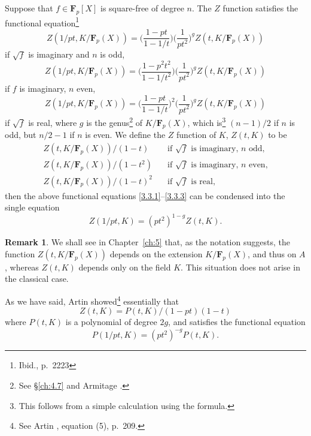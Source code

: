\documentclass[10pt,leqno]{article}
\theoremstyle{definition}
\newtheorem{rema}[theo]{Remark}
\def\FF{\mathbf{F}}
\def\fntwni{Ibid., p.~2223}
\def\fnthze{See \S\ref{ch:4.7} and Armitage \cite{bib:5}.}
\def\fnthon{This follows from a simple calculation using the formula.}
\def\fnthtw{See Artin \cite{bib:6}, equation (5), p.~209.}
\begin{document}
Suppose that $f \in \FF_p[X]$ is square-free of degree $n$.
The $Z$ function satisfies the functional equation\footnote{\fntwni}
\begin{equation}
\label{3.3.1}
Z(1/pt, K/\FF_p(X))
= \biggl(
\frac{1-pt}{1-1/t}
\biggr)
\biggl(
\frac{1}{pt^2}
\biggr)^g
Z(t, K/\FF_p(X))
\end{equation}
if $\sqrt f$ is imaginary and $n$ is odd,
\begin{equation}
\label{3.3.2}
Z(1/pt, K/\FF_p(X))
= \biggl(
\frac{1-p^2t^2}{1-1/t^2}
\biggr)
\biggl(
\frac{1}{pt^2}
\biggr)^g
Z(t, K/\FF_p(X))
\end{equation}
if $f$ is imaginary, $n$ even,
\begin{equation}
\label{3.3.3}
Z(1/pt, K/\FF_p(X))
= \biggl(
\frac{1-pt}{1-1/t}
\biggr)^2
\biggl(
\frac{1}{pt^2}
\biggr)^g
Z(t, K/\FF_p(X))
\end{equation}
if $\sqrt f$ is real, where $g$ is the genus\footnote{\fnthze} of $K/\FF_p(X)$, which is\footnote{\fnthon} $(n-1)/2$ if $n$ is odd, but $n/2 - 1$ if $n$ is even.
We define the $Z$ function of $K$, $Z(t,K)$ to be
\begin{equation}
\label{3.3.4}
\begin{aligned}
Z(t,K/\FF_p(X)) / (1-t) & \quad \text{if $\sqrt f$ is imaginary, $n$ odd,}
\\
Z(t,K/\FF_p(X)) / (1-t^2) & \quad \text{if $\sqrt f$ is imaginary, $n$ even,}
\\
Z(t,K/\FF_p(X)) / (1-t)^2 & \quad \text{if $\sqrt f$ is real,}
\end{aligned}
\end{equation}
then the above functional equations \eqref{3.3.1}--\eqref{3.3.3} can be condensed into the single equation
\begin{equation}
\label{3.3.5}
Z(1/pt,K) = (pt^2)^{1-g} Z(t,K).
\end{equation}


\begin{rema}
We shall see in Chapter~\ref{ch:5} that, as the notation suggests, 
the function
$Z(t, K/\FF_p(X))$ depends on the extension $K/\FF_p(X)$, and thus on $A$, whereas $Z(t,K)$ depends only on the field $K$.
This situation does not arise in the classical case.
\end{rema}

As we have said, Artin showed\footnote{\fnthtw} essentially that
\begin{equation}
\label{3.3.7}
Z(t,K) = P(t,K)/(1-pt)(1-t)
\end{equation}
where $P(t,K)$ is a polynomial of degree $2g$, and satisfies the functional equation
\begin{equation}
\label{3.3.8}
P(1/pt, K) = (pt^2)^{-g} P(t,K).
\end{equation}
\end{document}
